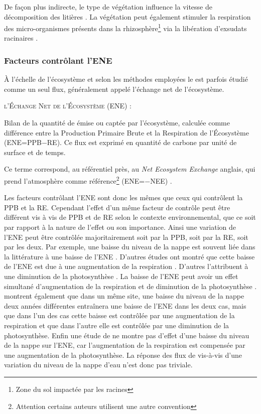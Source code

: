 De façon plus indirecte, le type de végétation influence la vitesse de décomposition des litières \citep{hobbie1996,liu2000,gogo2015}.
La végétation peut également stimuler la respiration des micro-organismes présents dans la rhizosphère\footnote{Zone du sol impactée par les racines} via la libération d'exsudats racinaires \citep{moore2002}.

\subsubsection{Facteurs contrôlant l'ENE}

À l'échelle de l'écosystème et selon les méthodes employées le \coo est parfois étudié comme un seul flux, généralement appelé l'échange net de l'écosystème.

\begin{pdef}
\textsc{l'Échange Net de l'Écosystème (ENE)} :

Bilan de la quantité de \coo émise ou captée par l'écosystème, calculée comme  différence entre la Production Primaire Brute et la Respiration de l'Écosystème (ENE=PPB$-$RE).
Ce flux est exprimé en quantité de carbone par unité de surface et de temps.
\end{pdef}
Ce terme correspond, au référentiel près, au \textit{Net Ecosystem Exchange} anglais, qui prend l'atmosphère comme référence\footnote{Attention certains auteurs utilisent une autre convention} (ENE=$-$NEE) \citep{chapin2006}.

Les facteurs contrôlant l'ENE sont donc les mêmes que ceux qui contrôlent la PPB et la RE.
Cependant l'effet d'un même facteur de contrôle peut être différent vis à vis de PPB et de RE selon le contexte environnemental, que ce soit par rapport à la nature de l'effet ou son importance.
Ainsi une variation de l'ENE peut être contrôlée majoritairement soit par la PPB, soit par la RE, soit par les deux.
Par exemple, une baisse du niveau de la nappe est souvent liée dans la littérature à une baisse de l'ENE \plop.
D'autres études ont montré que cette baisse de l'ENE est due à une augmentation de la respiration \citep{alm1999, ise2008}.
D'autres l'attribuent à une diminution de la photosynthèse \citep{sonnentag2010,peichl2014}.
La baisse de l'ENE peut avoir un effet simultané d'augmentation de la respiration et de diminution de la photosynthèse \citep{strack2013}.
\citet{lund2012} montrent également que dans un même site, une baisse du niveau de la nappe deux années différentes entraînera une baisse de l'ENE dans les deux cas, mais que dans l'un des cas cette baisse est contrôlée par une augmentation de la respiration et que dans l'autre elle est contrôlée par une diminution de la photosynthèse.
Enfin une étude de \citet{ballantyne2014} ne montre pas d'effet d'une baisse du niveau de la nappe sur l'ENE, car l'augmentation de la respiration est compensée par une augmentation de la photosynthèse.
La réponse des flux de \coo vis-à-vis d'une variation du niveau de la nappe d'eau n'est donc pas triviale.

